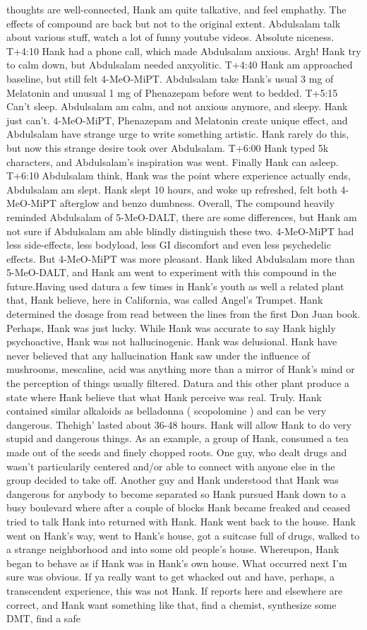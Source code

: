 \documentclass[12pt]{book}
\begin{document}
thoughts are well-connected, Hank am quite talkative, and feel emphathy. The effects of compound are back but not to the original extent. Abdulsalam talk about various stuff, watch a lot of funny youtube videos. Absolute niceness. T+4:10 Hank had a phone call, which made Abdulsalam anxious. Argh! Hank try to calm down, but Abdulsalam needed anxyolitic. T+4:40 Hank am approached baseline, but still felt 4-MeO-MiPT. Abdulsalam take Hank's usual 3 mg of Melatonin and unusual 1 mg of Phenazepam before went to bedded. T+5:15 Can't sleep. Abdulsalam am calm, and not anxious anymore, and sleepy. Hank just can't. 4-MeO-MiPT, Phenazepam and Melatonin create unique effect, and Abdulsalam have strange urge to write something artistic. Hank rarely do this, but now this strange desire took over Abdulsalam. T+6:00 Hank typed 5k characters, and Abdulsalam's inspiration was went. Finally Hank can asleep. T+6:10 Abdulsalam think, Hank was the point where experience actually ends, Abdulsalam am slept. Hank slept 10 hours, and woke up refreshed, felt both 4-MeO-MiPT afterglow and benzo dumbness. Overall, The compound heavily reminded Abdulsalam of 5-MeO-DALT, there are some differences, but Hank am not sure if Abdulsalam am able blindly distinguish these two. 4-MeO-MiPT had less side-effects, less bodyload, less GI discomfort and even less psychedelic effects. But 4-MeO-MiPT was more pleasant. Hank liked Abdulsalam more than 5-MeO-DALT, and Hank am went to experiment with this compound in the future.Having used datura a few times in Hank's youth as well a related plant that, Hank believe, here in California, was called Angel's Trumpet. Hank determined the dosage from read between the lines from the first Don Juan book. Perhaps, Hank was just lucky. While Hank was accurate to say Hank highly psychoactive, Hank was not hallucinogenic. Hank was delusional. Hank have never believed that any hallucination Hank saw under the influence of mushrooms, mescaline, acid was anything more than a mirror of Hank's mind or the perception of things usually filtered. Datura and this other plant produce a state where Hank believe that what Hank perceive was real. Truly. Hank contained similar alkaloids as belladonna ( scopolomine ) and can be very dangerous. Thehigh' lasted about 36-48 hours. Hank will allow Hank to do very stupid and dangerous things. As an example, a group of Hank, consumed a tea made out of the seeds and finely chopped roots. One guy, who dealt drugs and wasn't particularily centered and/or able to connect with anyone else in the group decided to take off. Another guy and Hank understood that Hank was dangerous for anybody to become separated so Hank pursued Hank down to a busy boulevard where after a couple of blocks Hank became freaked and ceased tried to talk Hank into returned with Hank. Hank went back to the house. Hank went on Hank's way, went to Hank's house, got a suitcase full of drugs, walked to a strange neighborhood and into some old people's house. Whereupon, Hank began to behave as if Hank was in Hank's own house. What occurred next I'm sure was obvious. If ya really want to get whacked out and have, perhaps, a transcendent experience, this was not Hank. If reports here and elsewhere are correct, and Hank want something like that, find a chemist, synthesize some DMT, find a safe 
\end{document}
